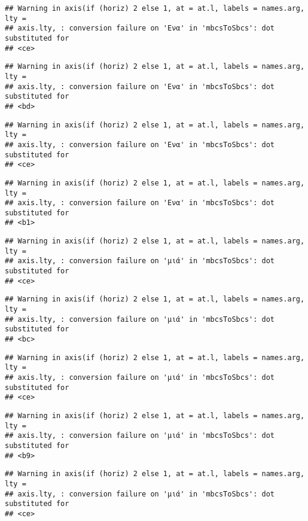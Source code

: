 \documentclass[
]{article}
\begin{document}
\begin{verbatim}
## Warning in axis(if (horiz) 2 else 1, at = at.l, labels = names.arg, lty =
## axis.lty, : conversion failure on 'Ενα' in 'mbcsToSbcs': dot substituted for
## <ce>
\end{verbatim}

\begin{verbatim}
## Warning in axis(if (horiz) 2 else 1, at = at.l, labels = names.arg, lty =
## axis.lty, : conversion failure on 'Ενα' in 'mbcsToSbcs': dot substituted for
## <bd>
\end{verbatim}

\begin{verbatim}
## Warning in axis(if (horiz) 2 else 1, at = at.l, labels = names.arg, lty =
## axis.lty, : conversion failure on 'Ενα' in 'mbcsToSbcs': dot substituted for
## <ce>
\end{verbatim}

\begin{verbatim}
## Warning in axis(if (horiz) 2 else 1, at = at.l, labels = names.arg, lty =
## axis.lty, : conversion failure on 'Ενα' in 'mbcsToSbcs': dot substituted for
## <b1>
\end{verbatim}

\begin{verbatim}
## Warning in axis(if (horiz) 2 else 1, at = at.l, labels = names.arg, lty =
## axis.lty, : conversion failure on 'μιά' in 'mbcsToSbcs': dot substituted for
## <ce>
\end{verbatim}

\begin{verbatim}
## Warning in axis(if (horiz) 2 else 1, at = at.l, labels = names.arg, lty =
## axis.lty, : conversion failure on 'μιά' in 'mbcsToSbcs': dot substituted for
## <bc>
\end{verbatim}

\begin{verbatim}
## Warning in axis(if (horiz) 2 else 1, at = at.l, labels = names.arg, lty =
## axis.lty, : conversion failure on 'μιά' in 'mbcsToSbcs': dot substituted for
## <ce>
\end{verbatim}

\begin{verbatim}
## Warning in axis(if (horiz) 2 else 1, at = at.l, labels = names.arg, lty =
## axis.lty, : conversion failure on 'μιά' in 'mbcsToSbcs': dot substituted for
## <b9>
\end{verbatim}

\begin{verbatim}
## Warning in axis(if (horiz) 2 else 1, at = at.l, labels = names.arg, lty =
## axis.lty, : conversion failure on 'μιά' in 'mbcsToSbcs': dot substituted for
## <ce>
\end{verbatim}
\end{document}
